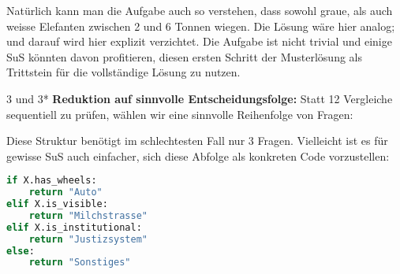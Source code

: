 Natürlich kann man die Aufgabe auch so verstehen, dass sowohl graue, als auch weisse Elefanten zwischen 2 und 6 Tonnen wiegen. Die Lösung wäre hier analog; und darauf wird hier explizit verzichtet. Die Aufgabe ist nicht trivial und einige SuS könnten davon profitieren, diesen ersten Schritt der Musterlösung als Trittstein für die vollständige Lösung zu nutzen.

\begin{aufgabe}{3 und 3*}
\textbf{Reduktion auf sinnvolle Entscheidungsfolge:} Statt 12 Vergleiche sequentiell zu prüfen, wählen wir eine sinnvolle Reihenfolge von Fragen:

\begin{center}
\end{center}

Diese Struktur benötigt im schlechtesten Fall nur 3 Fragen. Vielleicht ist es für gewisse SuS auch einfacher, sich diese Abfolge als konkreten Code vorzustellen:

\begin{lstlisting}[language=Python]
if X.has_wheels:
    return "Auto"
elif X.is_visible:
    return "Milchstrasse"
elif X.is_institutional:
    return "Justizsystem"
else:
    return "Sonstiges"
\end{lstlisting}
\end{aufgabe}


